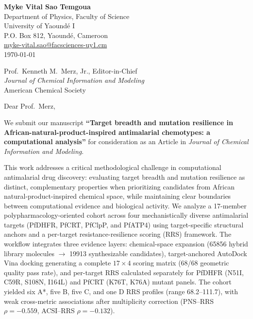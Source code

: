 \documentclass[9pt,letterpaper]{article}
\begin{document}
\fontsize{9}{10.5}\selectfont

\begin{flushleft}
\textbf{Myke Vital Sao Temgoua} \\
Department of Physics, Faculty of Science \\
University of Yaound\'{e} I \\
P.O. Box 812, Yaound\'{e}, Cameroon \\
\href{mailto:myke-vital.sao@facsciences-uy1.cm}{myke-vital.sao@facsciences-uy1.cm} \\[0.8em]
\today
\end{flushleft}

\begin{flushleft}
Prof.\ Kenneth M.\ Merz, Jr., Editor-in-Chief \\
\textit{Journal of Chemical Information and Modeling} \\
American Chemical Society
\end{flushleft}

\vspace{0.2em}

\noindent Dear Prof.\ Merz,

We submit our manuscript \textbf{``Target breadth and mutation resilience in African-natural-product-inspired antimalarial chemotypes: a computational analysis''} for consideration as an Article in \textit{Journal of Chemical Information and Modeling}.

This work addresses a critical methodological challenge in computational antimalarial drug discovery: evaluating target breadth and mutation resilience as distinct, complementary properties when prioritizing candidates from African natural-product-inspired chemical space, while maintaining clear boundaries between computational evidence and biological activity. We analyze a 17-member polypharmacology-oriented cohort across four mechanistically diverse antimalarial targets (PfDHFR, PfCRT, PfClpP, and PfATP4) using target-specific structural anchors and a per-target resistance-resilience scoring (RRS) framework. The workflow integrates three evidence layers: chemical-space expansion (\num{65856} hybrid library molecules $\rightarrow$ \num{19913} synthesizable candidates), target-anchored AutoDock Vina docking generating a complete $\num{17}\times\num{4}$ scoring matrix (\num{68}/\num{68} geometric quality pass rate), and per-target RRS calculated separately for PfDHFR (N51I, C59R, S108N, I164L) and PfCRT (K76T, K76A) mutant panels. The cohort yielded six A*, five B, five C, and one D RRS profiles (range \numrange{68.2}{111.7}), with weak cross-metric associations after multiplicity correction (PNS--RRS $\rho=-\num{0.559}$, ACSI--RRS $\rho=-\num{0.132}$).
\end{document}
